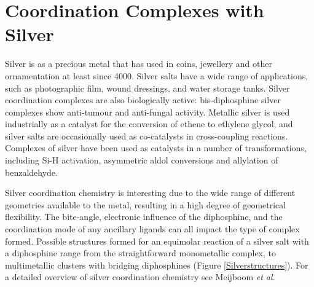 
\chapter{Coordination Complexes with Silver}
\label{ch:silver}

Silver is as a precious metal that has used in coins, jewellery and other ornamentation at least since 4000\BC.  Silver salts have a wide range of applications, such as photographic film, wound dressings, and water storage tanks.\cite{Enghag2004Ag}  Silver coordination complexes are also biologically active: bis-diphosphine silver complexes show anti-tumour and anti-fungal activity.\cite{Berners-Price1988, Liu2008}  Metallic silver is used industrially as a catalyst for the conversion of ethene to ethylene glycol, and silver salts are occasionally used as co-catalysts in cross-coupling reactions.\cite{Suzuki1999}  Complexes of silver have been used as catalysts in a number of transformations, including Si-H activation,\cite{Iglesias2012} asymmetric aldol conversions \cite{Sawamura1990} and allylation of benzaldehyde\cite{Malaise2006, Yanagisawa1999}.




Silver coordination chemistry is interesting due to the wide range of different geometries available to the metal, resulting in a high degree of geometrical flexibility. The bite-angle, electronic influence of the diphosphine, and the coordination mode of any ancillary ligands can all impact the type of complex formed.  Possible structures formed for an equimolar reaction of a silver salt with a diphosphine range from the straightforward monometallic complex, to multimetallic clusters with bridging diphosphines (Figure \ref{Silverstructures}).  For a detailed overview of silver coordination chemistry see Meijboom \emph{et al.}\cite{Meijboom2009}

